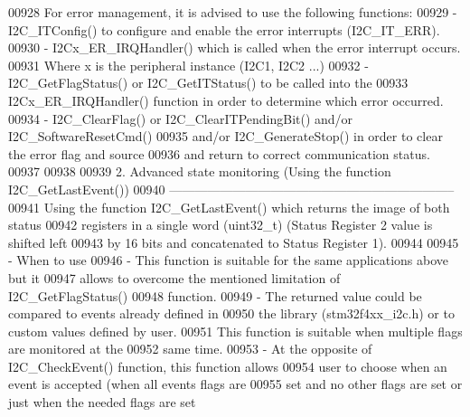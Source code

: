 \begin{DoxyCode}
00928 \textcolor{comment}{         For error management, it is advised to use the following functions:}
00929 \textcolor{comment}{           - I2C\_ITConfig() to configure and enable the error interrupts (I2C\_IT\_ERR).}
00930 \textcolor{comment}{           - I2Cx\_ER\_IRQHandler() which is called when the error interrupt occurs.}
00931 \textcolor{comment}{             Where x is the peripheral instance (I2C1, I2C2 ...)}
00932 \textcolor{comment}{           - I2C\_GetFlagStatus() or I2C\_GetITStatus()  to be called into the }
00933 \textcolor{comment}{             I2Cx\_ER\_IRQHandler() function in order to determine which error occurred.}
00934 \textcolor{comment}{           - I2C\_ClearFlag() or I2C\_ClearITPendingBit() and/or I2C\_SoftwareResetCmd() }
00935 \textcolor{comment}{             and/or I2C\_GenerateStop() in order to clear the error flag and source }
00936 \textcolor{comment}{             and return to correct  communication status.}
00937 \textcolor{comment}{             }
00938 \textcolor{comment}{ }
00939 \textcolor{comment}{     2. Advanced state monitoring (Using the function I2C\_GetLastEvent())}
00940 \textcolor{comment}{     -------------------------------------------------------------------- }
00941 \textcolor{comment}{        Using the function I2C\_GetLastEvent() which returns the image of both status }
00942 \textcolor{comment}{        registers in a single word (uint32\_t) (Status Register 2 value is shifted left }
00943 \textcolor{comment}{        by 16 bits and concatenated to Status Register 1).}
00944 \textcolor{comment}{}
00945 \textcolor{comment}{          - When to use}
00946 \textcolor{comment}{             - This function is suitable for the same applications above but it }
00947 \textcolor{comment}{               allows to overcome the mentioned limitation of I2C\_GetFlagStatus() }
00948 \textcolor{comment}{               function.}
00949 \textcolor{comment}{             - The returned value could be compared to events already defined in }
00950 \textcolor{comment}{               the library (stm32f4xx\_i2c.h) or to custom values defined by user.}
00951 \textcolor{comment}{               This function is suitable when multiple flags are monitored at the }
00952 \textcolor{comment}{               same time.}
00953 \textcolor{comment}{             - At the opposite of I2C\_CheckEvent() function, this function allows }
00954 \textcolor{comment}{               user to choose when an event is accepted (when all events flags are }
00955 \textcolor{comment}{               set and no other flags are set or just when the needed flags are set }

\end{DoxyCode}
